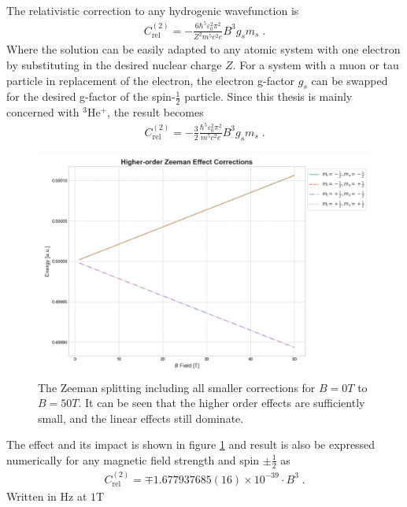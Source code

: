         The relativistic correction to any hydrogenic wavefunction is
        \begin{align}
            C_{\text{rel}}^{(2)} = - \frac{6\hbar^5 \varepsilon_0^2 \pi^2}{Z^2 m^5 c^2 e} B^3 g_s m_s\;.
        \end{align}
        \noindent Where the solution can be easily adapted to any atomic system with one electron by substituting in the desired nuclear charge $Z$. For a system with a muon or tau particle in replacement of the electron, the electron g-factor $g_s$ can be swapped for the desired g-factor of the spin-$\frac{1}{2}$ particle. Since this thesis is mainly concerned with $^3$He$^+$, the result becomes
        \begin{align}
            C_{\text{rel}}^{(2)} = - \frac{3}{2}\frac{\hbar^5 \varepsilon_0^2 \pi^2}{ m^5 c^2 e} B^3 g_s m_s\;.
        \end{align}
        \begin{figure}[h]
            \begin{center}
                \includegraphics[width=0.85\linewidth]{Zeeman_Graph.png}
                \caption{The Zeeman splitting including all smaller corrections for $B=0T$ to $B=50T$. It can be seen that the higher order effects are sufficiently small, and the linear effects still dominate.}\label{fig:d}
            \end{center}
        \end{figure}
        \noindent The effect and its impact is shown in figure \ref{fig:d} and result is also be expressed numerically for any magnetic field strength and spin $\pm \frac{1}{2}$ as
        \begin{align}
            C_{\text{rel}}^{(2)} = \mp 1.677937685(16)\times 10^{-39} \cdot B^3\;.
        \end{align}
        \noindent Written in Hz at $1$T
